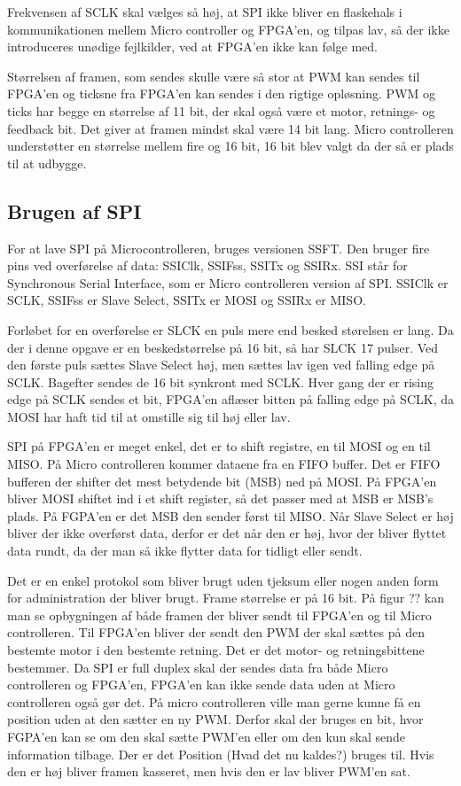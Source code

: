Frekvensen af SCLK skal vælges så høj, at SPI ikke bliver en flaskehals i kommunikationen mellem Micro controller og FPGA’en, og tilpas lav, så der ikke introduceres unødige fejlkilder, ved at FPGA’en ikke kan følge med.

Størrelsen af framen, som sendes skulle være så stor at PWM kan sendes til FPGA’en og ticksne fra FPGA’en kan sendes i den rigtige opløsning. PWM og ticks har begge en størrelse af 11 bit, der skal også være et motor, retnings- og feedback bit.  Det giver at framen mindst skal være 14 bit lang. Micro controlleren understøtter en størrelse mellem fire og 16 bit, 16 bit blev valgt da der så er plads til at udbygge.



\subsection{Brugen af SPI}

For at lave SPI på Microcontrolleren, bruges versionen SSFT. Den bruger fire pins ved overførelse af data: SSIClk, SSIFss, SSITx og SSIRx. SSI står for Synchronous Serial Interface, som er Micro controlleren version af SPI. SSIClk er SCLK, SSIFss er Slave Select, SSITx er MOSI og SSIRx er MISO.

Forløbet for en overførelse er SLCK en puls mere end besked størelsen er lang. Da der i denne opgave er en beskedstørrelse på 16 bit, så har SLCK 17 pulser. Ved den første puls sættes Slave Select høj, men sættes lav igen ved falling edge på SCLK. Bagefter sendes de 16 bit synkront med SCLK. Hver gang der er rising edge på SCLK sendes et bit, FPGA’en aflæser bitten på falling edge på SCLK, da MOSI har haft tid til at omstille sig til høj eller lav.

SPI på FPGA’en er meget enkel, det er to shift registre, en til MOSI og en til MISO. På Micro controlleren kommer dataene fra en FIFO buffer. Det er FIFO bufferen der shifter det mest betydende bit (MSB) ned på MOSI. På FPGA’en bliver MOSI shiftet ind i et shift register, så det passer med at MSB er MSB’s plads. På FGPA’en er det MSB den sender først til MISO. Når Slave Select er høj bliver der ikke overførst data, derfor er det når den er høj, hvor der bliver flyttet data rundt, da der man så ikke flytter data for tidligt eller sendt. 

Det er en enkel protokol som bliver brugt uden tjeksum eller nogen anden form for administration der bliver brugt. Frame størrelse er på 16 bit. På figur ?? kan man se opbygningen af både framen der bliver sendt til FPGA’en og til Micro controlleren. Til FPGA’en bliver der sendt den PWM der skal sættes på den bestemte motor i den bestemte retning. Det er det motor- og retningsbittene bestemmer. Da SPI er full duplex skal der sendes data fra både Micro controlleren og FPGA’en, FPGA’en kan ikke sende data uden at Micro controlleren også gør det. På micro controlleren ville man gerne kunne få en position uden at den sætter en ny PWM. Derfor skal der bruges en bit, hvor FGPA’en kan se om den skal sætte PWM’en eller om den kun skal sende information tilbage. Der er det Position (Hvad det nu kaldes?) bruges til. Hvis den er høj bliver framen kasseret, men hvis den er lav bliver PWM’en sat.  
